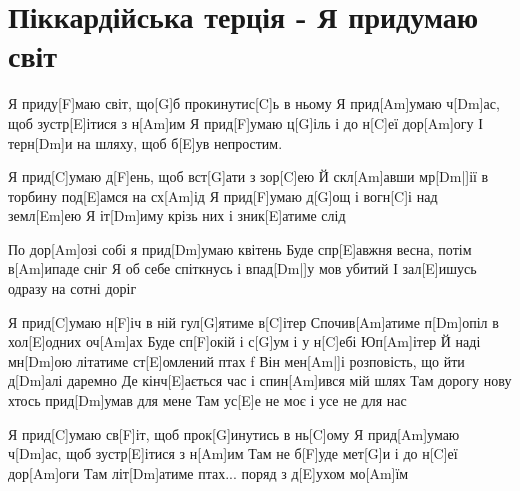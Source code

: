 \section{Піккардійська терція - Я придумаю світ}
\begin{guitar}
[C]Я приду[F]маю світ, що[G]б прокинутис[C]ь в ньому
Я прид[Am]умаю ч[Dm]ас, щоб зустр[E]ітися з н[Am]им
Я прид[F]умаю ц[G]іль і до н[C]еї дор[Am]огу
І терн[Dm]и на шляху, щоб б[E]ув непростим.

Я прид[C]умаю д[F]ень, щоб вст[G]ати з зор[C]ею
Й скл[Am]авши мр[Dm|]ії в торбину под[E]амся на сх[Am]ід
Я прид[F]умаю д[G]ощ і вогн[C]і над земл[Em]ею
Я іт[Dm]иму крізь них і зник[E]атиме слід

По дор[Am]озі собі я прид[Dm]умаю квітень
Буде спр[E]авжня весна, потім в[Am]ипаде сніг
Я об себе спіткнусь і впад[Dm|]у мов убитий
І зал[E]ишусь одразу на сотні доріг

Я прид[C]умаю н[F]іч в ній гул[G]ятиме в[C]ітер
Спочив[Am]атиме п[Dm]опіл в хол[E]одних оч[Am]ах
Буде сп[F]окій і с[G]ум і у н[C]ебі Юп[Am]ітер 
Й наді мн[Dm]ою літатиме ст[E]омлений птах
f
Він мен[Am|]і розповість, що йти д[Dm]алі даремно
Де кінч[E]ається час і спин[Am]ився мій шлях
Там дорогу нову хтось прид[Dm]умав для мене
Там ус[E]е не моє і усе не для нас

Я прид[C]умаю св[F]іт, щоб прок[G]инутись в нь[C]ому
Я прид[Am]умаю ч[Dm]ас, щоб зустр[E]ітися з н[Am]им
Там не б[F]уде мет[G]и і до н[C]еї дор[Am]оги
Там літ[Dm]атиме птах... поряд з д[E]ухом мо[Am]їм
\end{guitar}